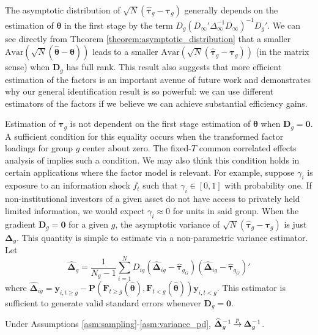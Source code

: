 \documentclass[12pt]{article}
\begin{document}
The asymptotic distribution of $\sqrt{N}(\widehat{\bm \tau}_g - \bm \tau_{g})$ generally depends on the estimation of $\bm{\theta}$ in the first stage by the term $D_g (D_\infty' \Delta_\infty^{-1} D_\infty)^{-1} D_g'$. We can see directly from Theorem \ref{theorem:asymptotic_distribution} that a smaller $\text{Avar}(\sqrt{N}(\widehat{\bm{\theta}} - \bm{\theta}))$ leads to a smaller $\text{Avar}(\sqrt{N}(\widehat{\bm \tau}_g - \bm \tau_g))$ (in the matrix sense) when $\bm D_g$ has full rank. This result also suggests that more efficient estimation of the factors is an important avenue of future work and demonstrates why our general identification result is so powerful: we can use different estimators of the factors if we believe we can achieve substantial efficiency gains. 

Estimation of $\bm \tau_g$ is not dependent on the first stage estimation of $\bm{\theta}$ when $\bm D_g = \bm 0$. A sufficient condition for this equality occurs when the transformed factor loadings for group $g$ center about zero. The fixed-$T$ common correlated effects analysis of \citet{Westerlund_Petrova_Norkute_2019} implies such a condition. We may also think this condition holds in certain applications where the factor model is relevant. For example, suppose $\gamma_i$ is exposure to an information shock $f_t$ such that $\gamma_i \in [0,1]$ with probability one. If non-institutional investors of a given asset do not have access to privately held limited information, we would expect $\gamma_i \approx 0$ for units in said group. When the gradient $\bm D_g = \bm 0$ for a given $g$, the asymptotic variance of $\sqrt{N}(\widehat{\bm \tau}_g - \bm \tau_g)$ is just $\bm \Delta_g$. This quantity is simple to estimate via a non-parametric variance estimator. Let 
\begin{equation}\label{eq:nonparametric_variance}
  \widehat{\bm \Delta}_g = \frac{1}{N_g - 1} \sum_{i = 1}^N D_{ig} \left( \widehat{\bm \Delta}_{ig} - \widehat{\bm \tau}_{g_G} \right) \left( \widehat{\bm \Delta}_{ig} - \widehat{\bm \tau}_{g_G} \right)'
\end{equation}
where $\widehat{\bm \Delta}_{ig} = \bm y_{i, t \geq g} - \bm P(\bm{F}_{t \geq g}(\widehat{\bm{\theta}}), \bm{F}_{t < g}(\widehat{\bm{\theta}})) \bm y_{i, t < g}$. This estimator is sufficient to generate valid standard errors whenever $\bm D_g = \bm 0$.
\begin{theorem}\label{theorem:nonparametric_variance}
  Under Assumptions \ref{asm:sampling}-\ref{asm:variance_pd}, $\widehat{\bm \Delta}_g^{-1} \mathbin{\overset{p}{\to}} \bm \Delta_g^{-1}$.
\end{theorem}
\end{document}
